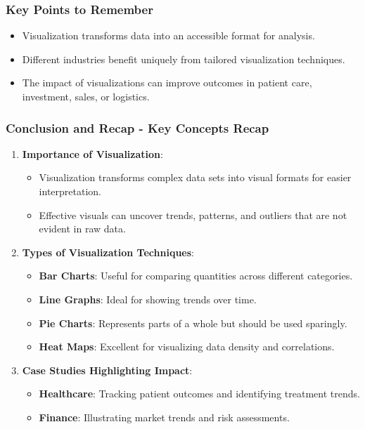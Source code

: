 \documentclass[aspectratio=169]{beamer}
\begin{document}
\begin{frame}[fragile]
    \frametitle{Key Points to Remember}
    \begin{itemize}
        \item Visualization transforms data into an accessible format for analysis.
        \item Different industries benefit uniquely from tailored visualization techniques.
        \item The impact of visualizations can improve outcomes in patient care, investment, sales, or logistics.
    \end{itemize}
\end{frame}

\begin{frame}[fragile]
    \frametitle{Conclusion and Recap - Key Concepts Recap}
    \begin{enumerate}
        \item \textbf{Importance of Visualization}:
        \begin{itemize}
            \item Visualization transforms complex data sets into visual formats for easier interpretation.
            \item Effective visuals can uncover trends, patterns, and outliers that are not evident in raw data.
        \end{itemize}

        \item \textbf{Types of Visualization Techniques}:
        \begin{itemize}
            \item \textbf{Bar Charts}: Useful for comparing quantities across different categories.
            \item \textbf{Line Graphs}: Ideal for showing trends over time.
            \item \textbf{Pie Charts}: Represents parts of a whole but should be used sparingly.
            \item \textbf{Heat Maps}: Excellent for visualizing data density and correlations.
        \end{itemize}
        
        \item \textbf{Case Studies Highlighting Impact}:
        \begin{itemize}
            \item \textbf{Healthcare}: Tracking patient outcomes and identifying treatment trends.
            \item \textbf{Finance}: Illustrating market trends and risk assessments.
        \end{itemize}
    \end{enumerate}
\end{frame}
\end{document}
